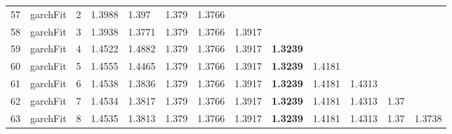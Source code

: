\documentclass[10pt,a4paper]{article}
\begin{document}
\begin{table}[ht]
\begin{tabular}{rlrllllllllll}
  57 & garchFit &     2 & 1.3988 & 1.397 & 1.379 & 1.3766 &  &  &  &  &  &  \\ 
  58 & garchFit &     3 & 1.3938 & 1.3771 & 1.379 & 1.3766 & 1.3917 &  &  &  &  &  \\ 
  59 & garchFit &     4 & 1.4522 & 1.4882 & 1.379 & 1.3766 & 1.3917 & \textbf{1.3239} &  &  &  &  \\ 
  60 & garchFit &     5 & 1.4555 & 1.4465 & 1.379 & 1.3766 & 1.3917 & \textbf{1.3239} & 1.4181 &  &  &  \\ 
  61 & garchFit &     6 & 1.4538 & 1.3836 & 1.379 & 1.3766 & 1.3917 & \textbf{1.3239} & 1.4181 & 1.4313 &  &  \\ 
  62 & garchFit &     7 & 1.4534 & 1.3817 & 1.379 & 1.3766 & 1.3917 & \textbf{1.3239} & 1.4181 & 1.4313 & 1.37 &  \\ 
  63 & garchFit &     8 & 1.4535 & 1.3813 & 1.379 & 1.3766 & 1.3917 & \textbf{1.3239} & 1.4181 & 1.4313 & 1.37 & 1.3738 \\ 
   \hline
\end{tabular}
\end{table}
\end{document}

